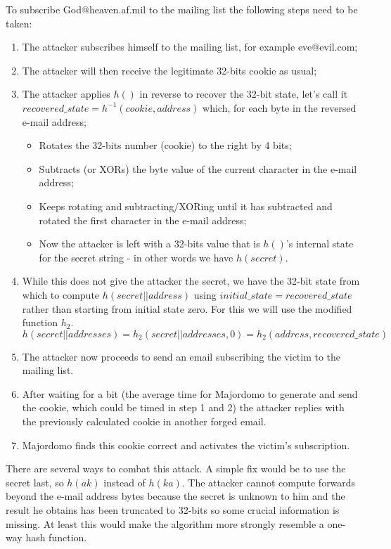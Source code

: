 \documentclass{article}
\begin{document}
To subscribe God@heaven.af.mil to the mailing list the following steps need to be taken:
\begin{enumerate}
	\item The attacker subscribes himself to the mailing list, for example eve@evil.com;
	\item The attacker will then receive the legitimate 32-bits cookie as usual;
	\item The attacker applies $h()$ in reverse to recover the 32-bit state, let's call it $recovered\_state = h^{-1}(cookie, address)$ which, for each byte in the reversed e-mail address;
		\begin{itemize}
		\item Rotates the 32-bits number (cookie) to the right by 4 bits;
		\item Subtracts (or XORs) the byte value of the current character in the e-mail address;
		\item Keeps rotating and subtracting/XORing until it has subtracted and rotated the first character in the e-mail address;
		\item Now the attacker is left with a 32-bits value that is $h()$'s internal state for the secret string - in other words we have $h(secret)$.
		\end{itemize}
	\item While this does not give the attacker the secret, we have the 32-bit state from which to compute $h(secret||address)$ using $initial\_state = recovered\_state$ rather than starting from initial state zero.
	For this we will use the modified function $h_2$.
\[ h(secret||addresses) = h_2(secret||addresses,0) = h_2(address, recovered\_state) \]
	\item The attacker now proceeds to send an email subscribing the victim to the mailing list.
	\item After waiting for a bit (the average time for Majordomo to generate and send the cookie, which could be timed in step 1 and 2) the attacker replies with the previously calculated cookie in another forged email.
	\item Majordomo finds this cookie correct and activates the victim's subscription.
\end{enumerate}
	
There are several ways to combat this attack.
A simple fix would be to use the secret last, so $h(ak)$ instead of $h(ka)$.
The attacker cannot compute forwards beyond the e-mail address bytes because the secret is unknown to him and the result he obtains has been truncated to 32-bits so some crucial information is missing.
At least this would make the algorithm more strongly resemble a one-way hash function.
\end{document}
